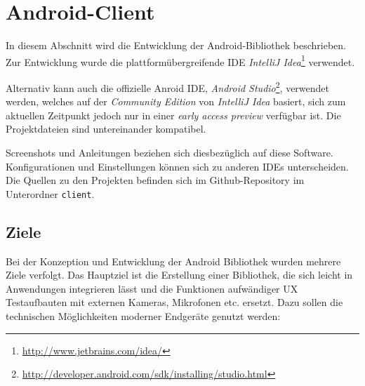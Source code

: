 \section{Android-Client}

In diesem Abschnitt wird die Entwicklung der Android-Bibliothek beschrieben. Zur Entwicklung wurde die plattformübergreifende IDE \emph{IntelliJ Idea}\footnote{\url{http://www.jetbrains.com/idea/}} verwendet.

Alternativ kann auch die offizielle Anroid \ac{IDE}, \emph{Android Studio}\footnote{\url{http://developer.android.com/sdk/installing/studio.html}}, verwendet werden, welches auf der \emph{Community Edition} von \emph{IntelliJ Idea} basiert, sich zum aktuellen Zeitpunkt jedoch nur in einer \emph{early access preview} verfügbar ist.
Die Projektdateien sind untereinander kompatibel.

Screenshots und Anleitungen beziehen sich diesbezüglich auf diese Software. Konfigurationen und Einstellungen können sich zu anderen IDEs unterscheiden.
Die Quellen zu den Projekten befinden sich im Github-Repository im Unterordner \texttt{client}.

\subsection{Ziele}
Bei der Konzeption und Entwicklung der Android Bibliothek wurden mehrere Ziele verfolgt.
Das Hauptziel ist die Erstellung einer Bibliothek, die sich leicht in Anwendungen integrieren lässt und die Funktionen aufwändiger \ac{UX} Testaufbauten mit externen Kameras, Mikrofonen etc. ersetzt.
Dazu sollen die technischen Möglichkeiten moderner Endgeräte genutzt werden:


